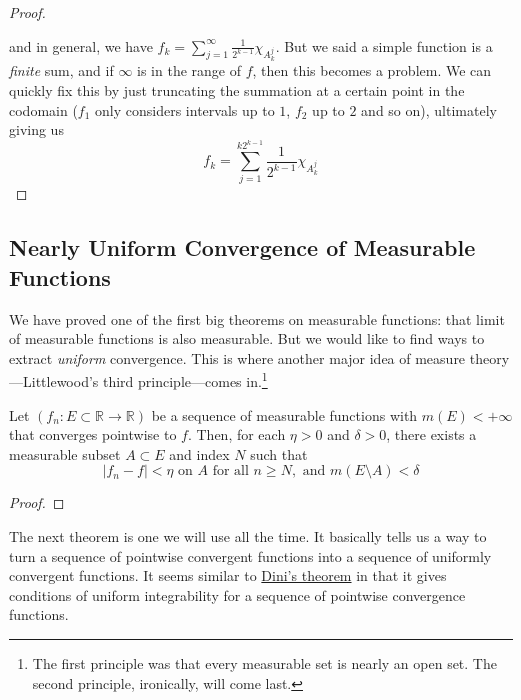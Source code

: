 \begin{proof}
\begin{center}
    \end{center}
    and in general, we have $f_k = \sum_{j=1}^\infty \frac{1}{2^{k-1}} \chi_{A^j_k}$. But we said a simple function is a \textit{finite} sum, and if $\infty$ is in the range of $f$, then this becomes a problem. We can quickly fix this by just truncating the summation at a certain point in the codomain ($f_1$ only considers intervals up to $1$, $f_2$ up to $2$ and so on), ultimately giving us 
    \begin{equation}
      f_k = \sum_{j=1}^{k 2^{k-1}} \frac{1}{2^{k-1}} \chi_{A^j_k} 
    \end{equation}
  \end{proof}

\subsection{Nearly Uniform Convergence of Measurable Functions} 

  We have proved one of the first big theorems on measurable functions: that limit of measurable functions is also measurable. But we would like to find ways to extract \textit{uniform} convergence. This is where another major idea of measure theory---Littlewood's third principle---comes in.\footnote{The first principle was that every measurable set is nearly an open set. The second principle, ironically, will come last.}

  \begin{lemma} 
    Let $(f_n: E \subset \mathbb{R} \to \mathbb{R})$ be a sequence of measurable functions with $m(E) < +\infty$ that converges pointwise to $f$. Then, for each $\eta > 0$ and $\delta > 0$, there exists a measurable subset $A \subset E$ and index $N$ such that 
    \begin{equation}
      |f_n - f| < \eta \text{ on } A \text{ for all } n \geq N, \text{ and } m(E \setminus A) < \delta 
    \end{equation}
  \end{lemma}
  \begin{proof}
    
  \end{proof}

  The next theorem is one we will use all the time. It basically tells us a way to turn a sequence of pointwise convergent functions into a sequence of uniformly convergent functions. It seems similar to \hyperref[real-thm:dini]{Dini's theorem} in that it gives conditions of uniform integrability for a sequence of pointwise convergence functions. 

